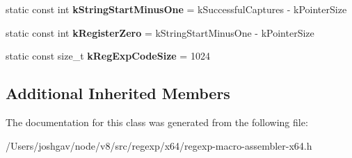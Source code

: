 \begin{DoxyCompactItemize}
\item 
static const int {\bfseries k\+String\+Start\+Minus\+One} = k\+Successful\+Captures -\/ k\+Pointer\+Size\hypertarget{classv8_1_1internal_1_1_reg_exp_macro_assembler_x64_a4051119829f8054885f217afd086618d}{}\label{classv8_1_1internal_1_1_reg_exp_macro_assembler_x64_a4051119829f8054885f217afd086618d}

\item 
static const int {\bfseries k\+Register\+Zero} = k\+String\+Start\+Minus\+One -\/ k\+Pointer\+Size\hypertarget{classv8_1_1internal_1_1_reg_exp_macro_assembler_x64_a544845eb5d55342951b90cee3d1035a9}{}\label{classv8_1_1internal_1_1_reg_exp_macro_assembler_x64_a544845eb5d55342951b90cee3d1035a9}

\item 
static const size\+\_\+t {\bfseries k\+Reg\+Exp\+Code\+Size} = 1024\hypertarget{classv8_1_1internal_1_1_reg_exp_macro_assembler_x64_a0b9b7bcf4ce2bf2cc23680661972524a}{}\label{classv8_1_1internal_1_1_reg_exp_macro_assembler_x64_a0b9b7bcf4ce2bf2cc23680661972524a}

\end{DoxyCompactItemize}
\subsection*{Additional Inherited Members}


The documentation for this class was generated from the following file\+:\begin{DoxyCompactItemize}
\item 
/\+Users/joshgav/node/v8/src/regexp/x64/regexp-\/macro-\/assembler-\/x64.\+h\end{DoxyCompactItemize}
